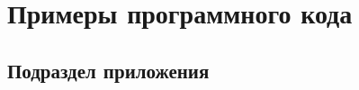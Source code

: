 \chapter{Примеры программного кода} \label{AppendixB}

\section{Подраздел приложения}\label{AppendixB1}

\normalsize%
